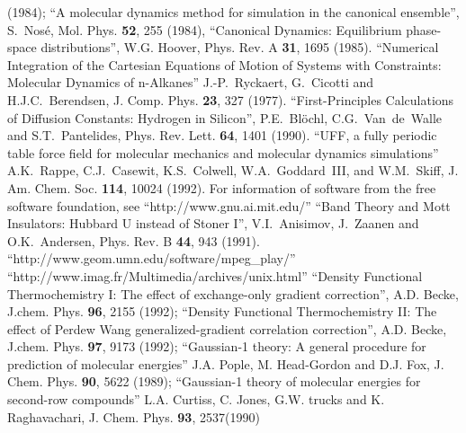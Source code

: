 \documentclass[final,12pt]{article}
\begin{document}
\begin{thebibliography}{99}
  (1984); ``A molecular dynamics method for simulation in the
  canonical ensemble'', S.~Nos\'e, Mol.  Phys. {\bf 52}, 255 (1984),
  ``Canonical Dynamics: Equilibrium phase-space distributions'', W.G.
  Hoover, Phys. Rev. A {\bf 31}, 1695 (1985).
 ``Numerical Integration of the Cartesian
  Equations of Motion of Systems with Constraints: Molecular
  Dynamics of n-Alkanes'' J.-P.~Ryckaert, G.~Cicotti and H.J.C.~Berendsen,
  J. Comp. Phys. {\bf 23}, 327 (1977).
 ``First-Principles Calculations of Diffusion Constants:
  Hydrogen in Silicon'', P.E.~Bl\"ochl, C.G.~Van~de~Walle and
  S.T.~Pantelides, Phys. Rev. Lett. {\bf 64}, 1401 (1990). 
 ``UFF, a fully periodic table force field for molecular
  mechanics and molecular dynamics simulations'' A.K.~Rappe,
  C.J.~Casewit, K.S.~Colwell, W.A.~Goddard~III, and W.M.~Skiff,
  J. Am. Chem. Soc. {\bf 114}, 10024 (1992).
 For information of software from the
  free software foundation, see ``http://www.gnu.ai.mit.edu/''
``Band Theory and Mott Insulators: Hubbard U instead of
  Stoner I'', V.I.~Anisimov, J.~Zaanen and 
O.K.~Andersen, Phys. Rev. B {\bf 44}, 943 (1991).
%
``http://www.geom.umn.edu/software/mpeg\_play/''
%
 ``http://www.imag.fr/Multimedia/archives/unix.html''
%
``Density Functional Thermochemistry I:
  The effect of exchange-only gradient correction'', A.D. Becke,
  J.chem. Phys. {\bf 96}, 2155 (1992); ``Density Functional
  Thermochemistry II: The effect of Perdew Wang generalized-gradient
  correlation correction'', A.D. Becke, J.chem. Phys. {\bf 97}, 9173
  (1992);
%
 ``Gaussian-1 theory: A general procedure for prediction
  of molecular energies'' J.A. Pople, M. Head-Gordon and D.J. Fox,
  J. Chem. Phys. {\bf 90}, 5622 (1989); ``Gaussian-1 theory of
  molecular energies for second-row compounds'' L.A. Curtiss,
  C. Jones, G.W. trucks and K. Raghavachari,
  J. Chem. Phys. {\bf 93}, 2537(1990)
\end{thebibliography}
\end{document}
